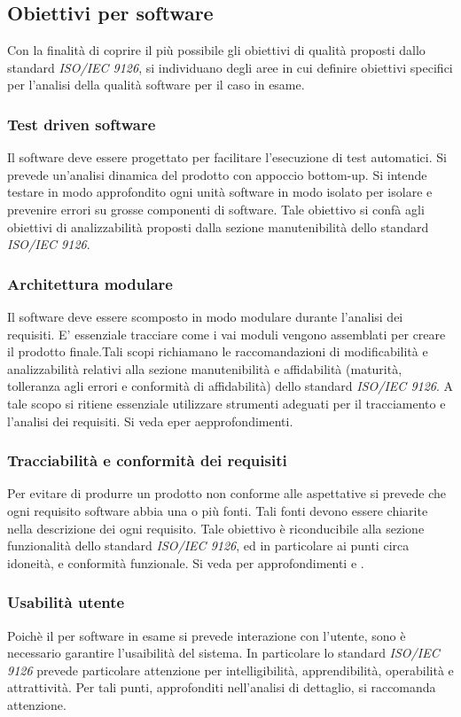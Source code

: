 \documentclass[12pt,a4paper]{article}
\begin{document}
\subsection{Obiettivi per software}

Con la finalità di coprire il più possibile gli obiettivi di qualità proposti dallo standard  \textit{ISO/IEC 9126}, si individuano degli aree in cui definire obiettivi specifici per l'analisi della qualità software per il caso in esame.
\subsubsection{Test driven software}
Il software deve essere progettato per facilitare l'esecuzione di test automatici. Si prevede un'analisi dinamica del prodotto con appoccio bottom-up. Si intende testare in modo approfondito ogni unità software in modo isolato per isolare e prevenire errori su grosse componenti di software. Tale obiettivo si confà agli obiettivi di analizzabilità proposti dalla sezione manutenibilità dello standard  \textit{ISO/IEC 9126}.
\subsubsection{Architettura modulare}
Il software deve essere scomposto in modo modulare durante l'analisi dei requisiti. E' essenziale tracciare come i vai moduli vengono assemblati per creare il prodotto finale.Tali scopi richiamano le raccomandazioni di modificabilità e analizzabilità relativi alla sezione manutenibilità e affidabilità (maturità, tolleranza agli errori e conformità di affidabilità) dello standard \textit{ISO/IEC 9126}. A tale scopo si ritiene essenziale utilizzare strumenti adeguati per il tracciamento e l'analisi dei requisiti. Si veda \NdP e\AdR per aepprofondimenti.
\subsubsection{Tracciabilità e conformità dei requisiti}
Per evitare di produrre un prodotto non conforme alle aspettative si prevede che ogni requisito software abbia una o più fonti. Tali fonti devono essere chiarite nella descrizione dei ogni requisito. Tale obiettivo è riconducibile alla sezione funzionalità dello standard  \textit{ISO/IEC 9126}, ed in particolare ai punti circa idoneità, e conformità funzionale. Si veda per approfondimenti \NdP e \AdR.
\subsubsection{Usabilità utente}
Poichè il per software in esame si prevede interazione con l'utente, sono è necessario garantire l'usaibilità del sistema. In particolare lo standard \textit{ISO/IEC 9126} prevede particolare attenzione per intelligibilità, apprendibilità, operabilità e attrattività. Per tali punti, approfonditi nell'analisi di dettaglio, si raccomanda attenzione.
\end{document}
